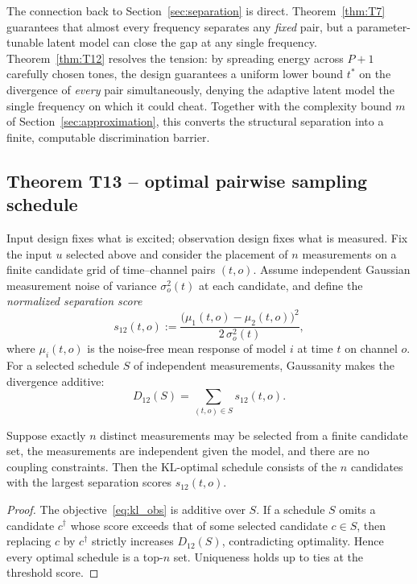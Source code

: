 The connection back to Section~\ref{sec:separation} is direct. Theorem~\ref{thm:T7} guarantees that almost every frequency separates any \emph{fixed} pair, but a parameter-tunable latent model can close the gap at any single frequency. Theorem~\ref{thm:T12} resolves the tension: by spreading energy across \(P+1\) carefully chosen tones, the design guarantees a uniform lower bound \(t^{*}\) on the divergence of \emph{every} pair simultaneously, denying the adaptive latent model the single frequency on which it could cheat. Together with the complexity bound \(m\) of Section~\ref{sec:approximation}, this converts the structural separation into a finite, computable discrimination barrier.

\subsection{Theorem T13 -- optimal pairwise sampling schedule}

Input design fixes what is excited; observation design fixes what is measured. Fix the input \(u\) selected above and consider the placement of \(n\) measurements on a finite candidate grid of time--channel pairs \((t, o)\). Assume independent Gaussian measurement noise of variance \(\sigma_o^2(t)\) at each candidate, and define the \emph{normalized separation score}
\begin{equation}
s_{12}(t, o) := \frac{\bigl( \mu_1(t, o) - \mu_2(t, o) \bigr)^2}{2\,\sigma_o^2(t)},
\label{eq:sep_score}
\end{equation}
where \(\mu_i(t,o)\) is the noise-free mean response of model \(i\) at time \(t\) on channel \(o\). For a selected schedule \(S\) of independent measurements, Gaussanity makes the divergence additive:
\begin{equation}
D_{12}(S) = \sum_{(t,o) \in S} s_{12}(t, o).
\label{eq:kl_obs}
\end{equation}

\begin{theorem}
\label{thm:T13}
Suppose exactly \(n\) distinct measurements may be selected from a finite candidate set, the measurements are independent given the model, and there are no coupling constraints. Then the KL-optimal schedule consists of the \(n\) candidates with the largest separation scores \(s_{12}(t, o)\).
\end{theorem}

\begin{proof}
The objective~\eqref{eq:kl_obs} is additive over \(S\). If a schedule \(S\) omits a candidate \(c^{\dagger}\) whose score exceeds that of some selected candidate \(c \in S\), then replacing \(c\) by \(c^{\dagger}\) strictly increases \(D_{12}(S)\), contradicting optimality. Hence every optimal schedule is a top-\(n\) set. Uniqueness holds up to ties at the threshold score.
\end{proof}

